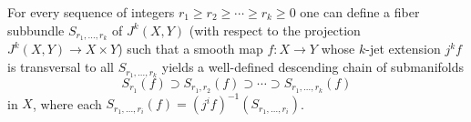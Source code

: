 For every sequence of integers $r_1 \ge r_2 \ge \cdots \ge r_k \ge 0$ one can define a fiber subbundle $S_{r_1,\ldots,r_k}$ of $J^k(X, Y)$ (with respect to the projection $J^k(X, Y) \to X \times Y$) such that a smooth map $f: X \to Y$ whose $k$-jet extension $j^k f$ is transversal to all $S_{r_1,\ldots,r_k}$ yields a well-defined descending chain of submanifolds
$$S_{r_1}(f) \supset S_{r_1,r_2}(f) \supset \cdots \supset S_{r_1,\ldots,r_k}(f)$$
in $X$, where each $S_{r_1,\ldots,r_i}(f) = (j^i f)^{-1}(S_{r_1,\ldots,r_i})$.
